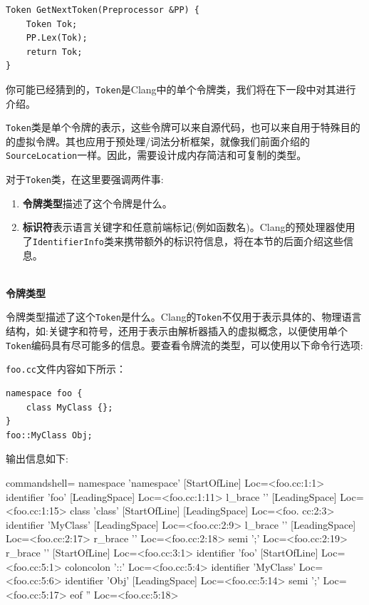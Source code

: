 \begin{lstlisting}[style=styleCXX]
Token GetNextToken(Preprocessor &PP) {
	Token Tok;
	PP.Lex(Tok);
	return Tok;
}
\end{lstlisting}

你可能已经猜到的，\texttt{Token}是Clang中的单个令牌类，我们将在下一段中对其进行介绍。


\texttt{Token}类是单个令牌的表示，这些令牌可以来自源代码，也可以来自用于特殊目的的虚拟令牌。其也应用于预处理/词法分析框架，就像我们前面介绍的\texttt{SourceLocation}一样。因此，需要设计成内存简洁和可复制的类型。

对于\texttt{Token}类，在这里要强调两件事:

\begin{enumerate}
\item \textbf{令牌类型}描述了这个令牌是什么。
\item \textbf{标识符}表示语言关键字和任意前端标记(例如函数名)。Clang的预处理器使用了\texttt{IdentifierInfo}类来携带额外的标识符信息，将在本节的后面介绍这些信息。
\end{enumerate}

\hspace*{\fill} \\ %
\noindent
\textbf{令牌类型}

令牌类型描述了这个\texttt{Token}是什么。Clang的\texttt{Token}不仅用于表示具体的、物理语言结构，如:关键字和符号，还用于表示由解析器插入的虚拟概念，以便使用单个\texttt{Token}编码具有尽可能多的信息。要查看令牌流的类型，可以使用以下命令行选项:


\texttt{foo.cc}文件内容如下所示：

\begin{lstlisting}[style=styleCXX]
namespace foo {
	class MyClass {};
}
foo::MyClass Obj;
\end{lstlisting}

输出信息如下:

\begin{tcblisting}{commandshell={}}
namespace 'namespace' [StartOfLine] Loc=<foo.cc:1:1>
identifier 'foo' [LeadingSpace] Loc=<foo.cc:1:11>
l_brace '{' [LeadingSpace] Loc=<foo.cc:1:15>
class 'class' [StartOfLine] [LeadingSpace] Loc=<foo.
cc:2:3>
identifier 'MyClass' [LeadingSpace] Loc=<foo.cc:2:9>
l_brace '{' [LeadingSpace] Loc=<foo.cc:2:17>
	r_brace '}' Loc=<foo.cc:2:18>
semi ';' Loc=<foo.cc:2:19>
r_brace '}' [StartOfLine] Loc=<foo.cc:3:1>
identifier 'foo' [StartOfLine] Loc=<foo.cc:5:1>
coloncolon '::' Loc=<foo.cc:5:4>
identifier 'MyClass' Loc=<foo.cc:5:6>
identifier 'Obj' [LeadingSpace] Loc=<foo.cc:5:14>
semi ';' Loc=<foo.cc:5:17>
eof '' Loc=<foo.cc:5:18>
\end{tcblisting}

